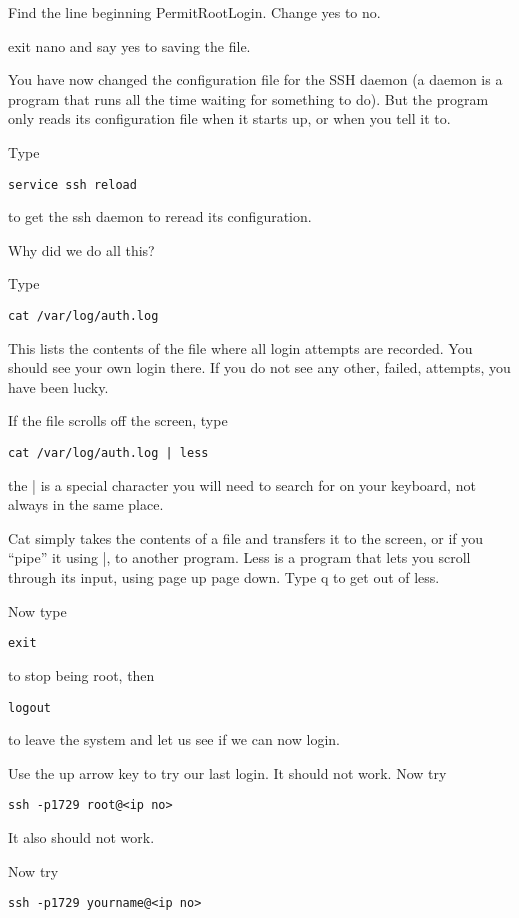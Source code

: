 \documentclass[12pt, a4paper]{article}
\begin{document}
Find the line beginning PermitRootLogin. Change yes to no.

exit nano and say yes to saving the file.

You have now changed the configuration file for the SSH daemon (a daemon is a program that runs all the time waiting for something to do). But the program only reads its configuration file when it starts up, or when you tell it to.

Type
\begin{verbatim}
service ssh reload
\end{verbatim}
to get the ssh daemon to reread its configuration.

Why did we do all this?

Type 
\begin{verbatim}
cat /var/log/auth.log
\end{verbatim}

This lists the contents of the file where all login attempts are recorded. You should see your own login there. If you do not see any other, failed, attempts, you have been lucky.

If the file scrolls off the screen, type
\begin{verbatim}
cat /var/log/auth.log | less
\end{verbatim}
the | is a special character you will need to search for on your keyboard, not always in the same place.

Cat simply takes the contents of a file and transfers it to the screen, or if you “pipe” it using |, to another program. Less is a program that lets you scroll through its input, using page up page down. Type q to get out of less.  

Now type
\begin{verbatim}
exit
\end{verbatim}
to stop being root, then
\begin{verbatim}
logout
\end{verbatim}
to leave the system
and let us see if we can now login.

Use the up arrow key to try our last login. It should not work.
Now try

\begin{verbatim}
ssh -p1729 root@<ip no>
\end{verbatim}

It also should not work.

Now try
\begin{verbatim}
ssh -p1729 yourname@<ip no>
\end{verbatim}
\end{document}
